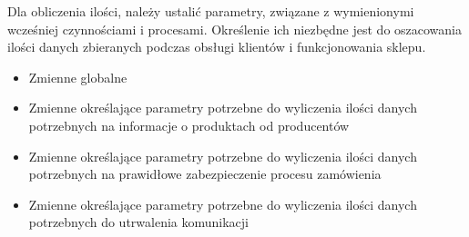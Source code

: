					\par Dla obliczenia ilości, należy ustalić parametry, związane z wymienionymi wcześniej czynnościami i procesami. Określenie ich niezbędne jest do oszacowania ilości danych zbieranych podczas obsługi klientów i funkcjonowania sklepu. 
		
					\begin{itemize}
						\item Zmienne globalne 
						\item Zmienne określające parametry potrzebne do wyliczenia ilości danych potrzebnych na informacje o produktach od producentów
						\item Zmienne określające parametry potrzebne do wyliczenia ilości danych potrzebnych na prawidłowe zabezpieczenie procesu zamówienia
						\item Zmienne określające parametry potrzebne do wyliczenia ilości danych potrzebnych do utrwalenia komunikacji
\end{itemize}
